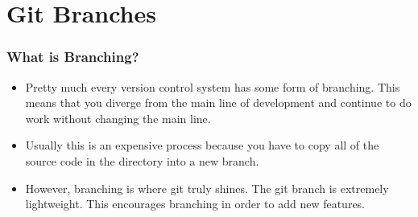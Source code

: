 
\section[Branching]{Git Branches}

\begin{frame}
\frametitle{\large What is Branching?}
\begin{itemize}
\item Pretty much every version control system has some form of branching. This means that you diverge from the main line of development and continue to do work without changing the main line.
\pause
\item Usually this is an expensive process because you have to copy all of the source code in the directory into a new branch.
\pause
\item However, branching is where git truly shines. The git branch is extremely lightweight. This encourages branching in order to add new features.
\end{itemize}
\end{frame}